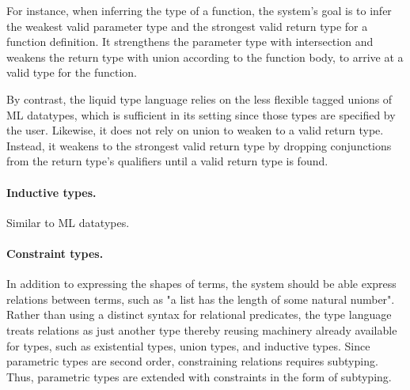 \documentclass[acmsmall]{acmart}
\begin{document}
For instance, when inferring the type of a function, 
the system's goal is to infer the weakest valid parameter type and the strongest valid return type for a function definition.
It strengthens the parameter type with intersection and weakens the return type with union according to the function body,
to arrive at a valid type for the function.  

By contrast, the liquid type language relies on the less flexible tagged unions of ML datatypes, 
which is sufficient in its setting since those types are specified by the user. 
Likewise, it does not rely on union to weaken to a valid return type. 
Instead, it weakens to the strongest valid return type by dropping conjunctions from 
the return type's qualifiers until a valid return type is found.

\paragraph{Inductive types.} Similar to ML datatypes.

\paragraph{Constraint types.}
In addition to expressing the shapes of terms, the system should be able express relations between terms,
such as "a list has the length of some natural number".
Rather than using a distinct syntax for relational predicates, 
the type language treats relations as just another type thereby reusing machinery already 
available for types, such as existential types, union types, and inductive types.
Since parametric types are second order, constraining relations requires subtyping.
Thus, parametric types are extended with constraints in the form of subtyping.
\end{document}
